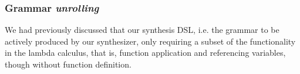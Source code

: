 \documentclass{article}
\begin{document}
\subsubsection{Grammar \emph{unrolling}} \label{sec:unroll}

We had previously discussed that our synthesis DSL,
i.e. the grammar to be actively produced by our synthesizer,
only requiring a subset of the functionality in the lambda calculus,
that is, function application and referencing variables,
though without function definition.

\end{document}
